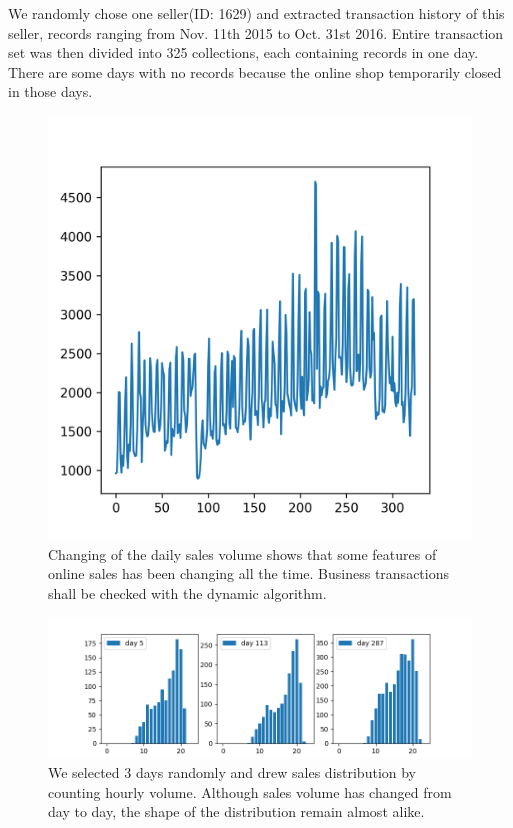 \documentclass[a4paper]{IEEEtran}
\begin{document}
			We randomly chose one seller(ID: 1629) and extracted transaction history of this seller, records ranging from Nov. 11th 2015 to Oct. 31st 2016. Entire transaction set was then divided into 325 collections, each containing records in one day. There are some days with no records because the online shop temporarily closed in those days.
			
			\begin{figure}[!ht]
				\centering
				\includegraphics[width=0.75\linewidth]{fig/DailyTransactionVolume.png}
				\caption{Changing of the daily sales volume shows that some features of online sales has been changing all the time. Business transactions shall be checked with the dynamic algorithm.}
				\label{fig:daily-transaction-volume}
			\end{figure}
			
			\begin{figure}[ht]
				\centering
				\includegraphics[width=\linewidth]{fig/SaleDistributionSamples.png}
				\caption{We selected 3 days randomly and drew sales distribution by counting hourly volume. Although sales volume has changed from day to day, the shape of the distribution remain almost alike.}
				\label{fig:sale-distribution-sample}
			\end{figure}
			
\end{document}
